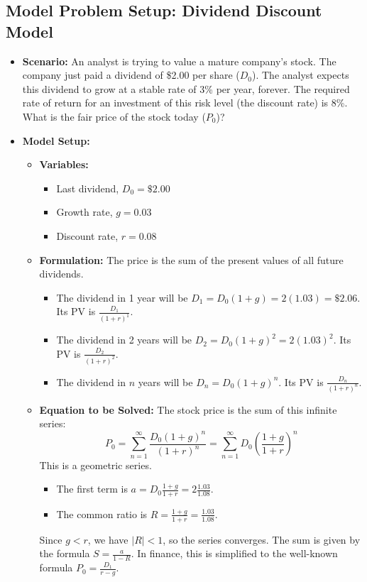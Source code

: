 \documentclass{article}
\begin{document}
\subsection{Model Problem Setup: Dividend Discount Model}
\begin{itemize}
    \item \textbf{Scenario:} An analyst is trying to value a mature company's stock. The company just paid a dividend of \$2.00 per share ($D_0$). The analyst expects this dividend to grow at a stable rate of 3\% per year, forever. The required rate of return for an investment of this risk level (the discount rate) is 8\%. What is the fair price of the stock today ($P_0$)?
    \item \textbf{Model Setup:}
        \begin{itemize}
            \item \textbf{Variables:}
                \begin{itemize}
                    \item Last dividend, $D_0 = \$2.00$
                    \item Growth rate, $g = 0.03$
                    \item Discount rate, $r = 0.08$
                \end{itemize}
            \item \textbf{Formulation:} The price is the sum of the present values of all future dividends.
                \begin{itemize}
                    \item The dividend in 1 year will be $D_1 = D_0(1+g) = 2(1.03) = \$2.06$. Its PV is $\frac{D_1}{(1+r)^1}$.
                    \item The dividend in 2 years will be $D_2 = D_0(1+g)^2 = 2(1.03)^2$. Its PV is $\frac{D_2}{(1+r)^2}$.
                    \item The dividend in $n$ years will be $D_n = D_0(1+g)^n$. Its PV is $\frac{D_n}{(1+r)^n}$.
                \end{itemize}
            \item \textbf{Equation to be Solved:} The stock price is the sum of this infinite series:
            \[ P_0 = \sum_{n=1}^{\infty} \frac{D_0(1+g)^n}{(1+r)^n} = \sum_{n=1}^{\infty} D_0 \left( \frac{1+g}{1+r} \right)^n \]
            This is a geometric series.
            \begin{itemize}
                \item The first term is $a = D_0 \frac{1+g}{1+r} = 2 \frac{1.03}{1.08}$.
                \item The common ratio is $R = \frac{1+g}{1+r} = \frac{1.03}{1.08}$.
            \end{itemize}
            Since $g<r$, we have $|R|<1$, so the series converges. The sum is given by the formula $S = \frac{a}{1-R}$. In finance, this is simplified to the well-known formula $P_0 = \frac{D_1}{r-g}$.
        \end{itemize}
\end{itemize}
\end{document}
